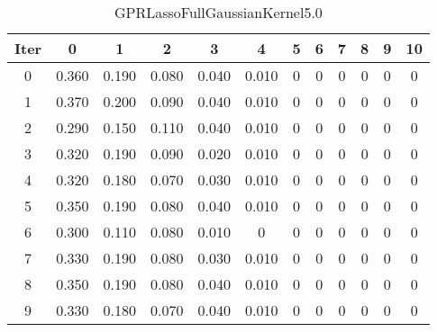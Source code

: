 \begin{table}
	\begin{center}
		\begin{tabular}{|c|c|c|c|c|c|c|c|c|c|c|c|}
			\hline
			Iter & 0 & 1 & 2 & 3 & 4 & 5 & 6 & 7 & 8 & 9 & 10 \\
			\hline
			0 & 0.360 & 0.190 & 0.080 & 0.040 & 0.010 & 0 & 0 & 0 & 0 & 0 & 0 \\
			\hline
			1 & 0.370 & 0.200 & 0.090 & 0.040 & 0.010 & 0 & 0 & 0 & 0 & 0 & 0 \\
			\hline
			2 & 0.290 & 0.150 & 0.110 & 0.040 & 0.010 & 0 & 0 & 0 & 0 & 0 & 0 \\
			\hline
			3 & 0.320 & 0.190 & 0.090 & 0.020 & 0.010 & 0 & 0 & 0 & 0 & 0 & 0 \\
			\hline
			4 & 0.320 & 0.180 & 0.070 & 0.030 & 0.010 & 0 & 0 & 0 & 0 & 0 & 0 \\
			\hline
			5 & 0.350 & 0.190 & 0.080 & 0.040 & 0.010 & 0 & 0 & 0 & 0 & 0 & 0 \\
			\hline
			6 & 0.300 & 0.110 & 0.080 & 0.010 & 0 & 0 & 0 & 0 & 0 & 0 & 0 \\
			\hline
			7 & 0.330 & 0.190 & 0.080 & 0.030 & 0.010 & 0 & 0 & 0 & 0 & 0 & 0 \\
			\hline
			8 & 0.350 & 0.190 & 0.080 & 0.040 & 0.010 & 0 & 0 & 0 & 0 & 0 & 0 \\
			\hline
			9 & 0.330 & 0.180 & 0.070 & 0.040 & 0.010 & 0 & 0 & 0 & 0 & 0 & 0 \\
			\hline
		\end{tabular}
	\end{center}
	\caption{GPRLassoFullGaussianKernel5.0}
\end{table}